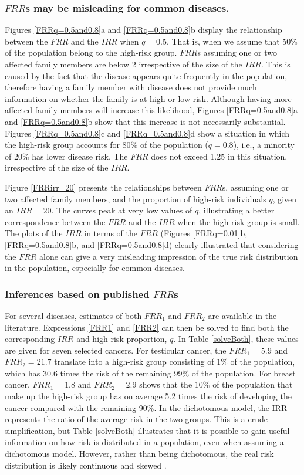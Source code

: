 \documentclass{bmcart}
\begin{document}
\subsubsection*{$FRR$s may be misleading for common diseases.}
Figures \ref{FRRq=0.5and0.8}a and \ref{FRRq=0.5and0.8}b display the relationship between the $FRR$ and the $IRR$ when $q=0.5$. That is, when we assume that 50\% of the population belong to the high-risk group. $FRR$s assuming one or two affected family members are below 2 irrespective of the size of the $IRR$. This is caused by the fact that the disease appears quite frequently in the population, therefore having a family member with disease does not provide much information on whether the family is at high or low risk. Although having more affected family members will increase this likelihood, Figures \ref{FRRq=0.5and0.8}a and \ref{FRRq=0.5and0.8}b show that this increase is not necessarily substantial. Figures \ref{FRRq=0.5and0.8}c and \ref{FRRq=0.5and0.8}d show a situation in which the high-risk group accounts for 80\% of the population ($q=0.8$), i.e., a minority of 20\% has lower disease risk. The $FRR$ does not exceed 1.25 in this situation, irrespective of the size of the $IRR$. 

Figure \ref{FRRirr=20} presents the relationships between $FRR$s, assuming one or two affected family members, and the proportion of high-risk individuals $q$, given an $IRR=20$. The curves peak at very low values of $q$, illustrating a better correspondence between the $FRR$ and the $IRR$ when the high-risk group is small. The plots of the $IRR$ in terms of the $FRR$ (Figures \ref{FRRq=0.01}b, \ref{FRRq=0.5and0.8}b, and \ref{FRRq=0.5and0.8}d) clearly illustrated that considering the $FRR$ alone can give a very misleading impression of the true risk distribution in the population, especially for common diseases. 

\subsubsection*{Inferences based on published $FRR$s}
For several diseases, estimates of both $FRR_1$ and $FRR_2$ are available in the literature. Expressions \ref{FRR1} and \ref{FRR2} can then be solved to find both the corresponding $IRR$ and high-risk proportion, $q$. In Table \ref{solveBoth}, these values are given for seven selected cancers. For testicular cancer, the $FRR_1=5.9$ and $FRR_2=21.7$ translate into a high-risk group consisting of $1\%$ of the population, which has 30.6 times the risk of the remaining $99\%$ of the population. For breast cancer, $FRR_1=1.8$ and $FRR_2=2.9$ shows that the $10\%$ of the population that make up the high-risk group has on average 5.2 times the risk of developing the cancer compared with the remaining 90\%. In the dichotomous model, the IRR represents the ratio of the average risk in the two groups. This is a crude simplification, but Table \ref{solveBoth} illustrates that it is possible to gain useful information on how risk is distributed in a population, even when assuming a dichotomous model. However, rather than being dichotomous, the real risk distribution is likely continuous and skewed \cite{aalen2014understanding}.
\end{document}
